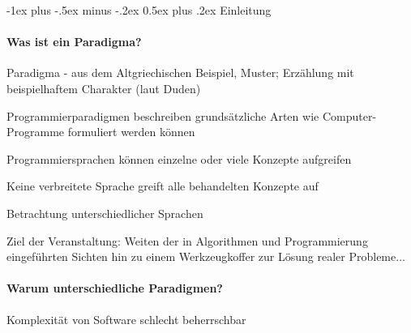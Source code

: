 \documentclass[10pt]{article}
\makeatletter
\renewcommand{\section}{\@startsection{section}{1}{0mm}%
                                {-1ex plus -.5ex minus -.2ex}%
                                {0.5ex plus .2ex}%
                                {\normalfont\large\bfseries}}
\makeatother
\begin{document}
\raggedright
\footnotesize


\setlength{\columnseprule}{0.25pt}
\setlength{\premulticols}{1pt}
\setlength{\postmulticols}{1pt}
\setlength{\multicolsep}{1pt}
\setlength{\columnsep}{2pt}

\section{Einleitung}
\paragraph{Was ist ein Paradigma?}
\begin{itemize*}
  \item Paradigma - aus dem Altgriechischen Beispiel, Muster; Erzählung mit beispielhaftem Charakter (laut Duden)
  \item Programmierparadigmen beschreiben grundsätzliche Arten wie Computer-Programme formuliert werden können
  \item Programmiersprachen können einzelne oder viele Konzepte aufgreifen
  \begin{itemize*}
    \item Keine verbreitete Sprache greift alle behandelten Konzepte auf
    \item Betrachtung unterschiedlicher Sprachen
  \end{itemize*}
  \item Ziel der Veranstaltung: Weiten der in Algorithmen und Programmierung eingeführten Sichten hin zu einem Werkzeugkoffer zur Lösung realer Probleme...
\end{itemize*}

\paragraph{Warum unterschiedliche Paradigmen?}
Komplexität von Software schlecht beherrschbar
\end{document}
